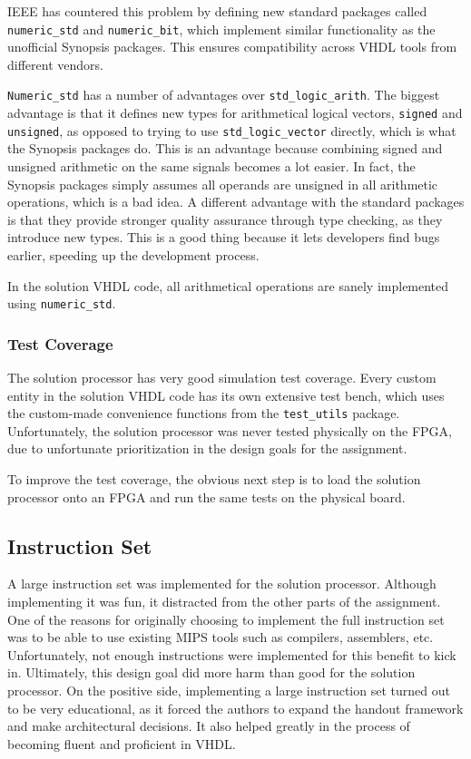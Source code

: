 IEEE has countered this problem by defining new standard packages called \texttt{numeric\_std} and \texttt{numeric\_bit}, which implement similar functionality as the unofficial Synopsis packages.
This ensures compatibility across VHDL tools from different vendors.

\texttt{Numeric\_std} has a number of advantages over \texttt{std\_logic\_arith}.
The biggest advantage is that it defines new types for arithmetical logical vectors, \texttt{signed} and \texttt{unsigned}, as opposed to trying to use \texttt{std\_logic\_vector} directly, which is what the Synopsis packages do.
This is an advantage because combining signed and unsigned arithmetic on the same signals becomes a lot easier.
In fact, the Synopsis packages simply assumes all operands are unsigned in all arithmetic operations, which is a bad idea.
A different advantage with the standard packages is that they provide stronger quality assurance through type checking, as they introduce new types.
This is a good thing because it lets developers find bugs earlier, speeding up the development process.

In the solution VHDL code, all arithmetical operations are sanely implemented using \texttt{numeric\_std}.

\subsubsection{Test Coverage}

The solution processor has very good simulation test coverage.
Every custom entity in the solution VHDL code has its own extensive test bench, which uses the custom-made convenience functions from the \texttt{test\_utils} package.
Unfortunately, the solution processor was never tested physically on the FPGA, due to unfortunate prioritization in the design goals for the assignment.

To improve the test coverage, the obvious next step is to load the solution processor onto an FPGA and run the same tests on the physical board.

\subsection{Instruction Set}

A large instruction set was implemented for the solution processor.
Although implementing it was fun, it distracted from the other parts of the assignment.
One of the reasons for originally choosing to implement the full instruction set was to be able to use existing MIPS tools such as compilers, assemblers, etc.
Unfortunately, not enough instructions were implemented for this benefit to kick in.
Ultimately, this design goal did more harm than good for the solution processor.
On the positive side, implementing a large instruction set turned out to be very educational, as it forced the authors to expand the handout framework and make architectural decisions.
It also helped greatly in the process of becoming fluent and proficient in VHDL.

